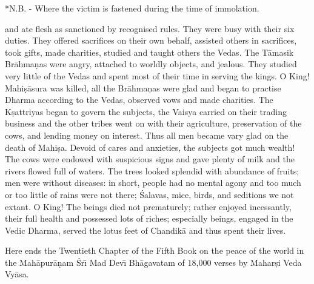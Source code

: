 *N.B. - Where the victim is fastened during the time of immolation.

and ate flesh as sanctioned by recognised rules. They were busy with their six duties. They offered sacrifices on their own behalf, assisted others in sacrifices, took gifts, made charities, studied and taught others the Vedas. The T\=amasik Br\=ahma\d{n}as were angry, attached to worldly objects, and jealous. They studied very little of the Vedas and spent most of their time in serving the kings. O King! Mahi\d{s}\=asura was killed, all the Br\=ahma\d{n}as were glad and began to practise Dharma according to the Vedas, observed vows and made charities. The K\d{s}attriyas began to govern the subjects, the Vaisya carried on their trading business and the other tribes went on with their agriculture, preservation of the cows, and lending money on interest. Thus all men became vary glad on the death of Mahi\d{s}a. Devoid of cares and anxieties, the subjects got much wealth! The cows were endowed with suspicious signs and gave plenty of milk and the rivers flowed full of waters. The trees looked splendid with abundance of fruits; men were without diseases: in short, people had no mental agony and too much or too little of rains were not there; \'Salavas, mice, birds, and seditions we not extant. O King! The beings died not prematurely; rather enjoyed incessantly, their full health and possessed lots of riches; especially beings, engaged in the Vedic Dharma, served the lotus feet of Chandik\=a and thus spent their lives.

Here ends the Twentieth Chapter of the Fifth Book on the peace of the world in the Mah\=apur\=a\d{n}am \'Sr\={\i} Mad Dev\={\i} Bh\=agavatam of 18,000 verses by Mahar\d{s}i Veda Vy\=asa.



